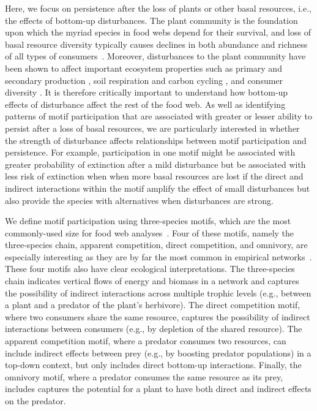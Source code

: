 \documentclass[12pt]{article}
\begin{document}
\begin{spacing}{2.0}
    
    Here, we focus on persistence after the loss of plants or other basal resources, i.e., the effects of bottom-up disturbances.
    The plant community is the foundation upon which the myriad species in food webs depend for their survival, and loss of basal resource diversity typically causes declines in both abundance and richness of all types of consumers~\citep{scherber2010bottom,Dobson2009food, Mduma1999food, Georgiadis2007}.
    Moreover, disturbances to the plant community have been shown to affect important ecosystem properties such as primary \citep{Hector1999} and secondary production \citep{borer2012plant}, soil respiration and carbon cycling \citep{chen2019plant}, and consumer diversity \citep{scherber2010bottom, Baiser2016,li2020bottom}.
    It is therefore critically important to understand how bottom-up effects of disturbance affect the rest of the food web.
    As well as identifying patterns of motif participation that are associated with greater or lesser ability to persist after a loss of basal resources, we are particularly interested in whether the strength of  disturbance affects relationships between motif participation and persistence.
    For example, participation in one motif might be associated with greater probability of extinction after a mild disturbance but be associated with less risk of extinction when when more basal resources are lost if the direct and indirect interactions within the motif amplify the effect of small disturbances but also provide the species with alternatives when disturbances are strong.

    

    We define motif participation using three-species motifs, which are the most commonly-used size for food web analyses~\citep{Milo2004,Stouffer2007,Stouffer2012,Cirtwill2015a}. 
    Four of these motifs, namely the three-species chain, apparent competition, direct competition, and omnivory, are especially interesting as they are by far the most common in empirical networks~\citep{Stouffer2007, Borrelli2015a, giling2019plant}.
    These four motifs also have clear ecological interpretations.
    The three-species chain indicates vertical flows of energy and biomass in a network and captures the possibility of indirect interactions across multiple trophic levels (e.g., between a plant and a predator of the plant's herbivore).
    The direct competition motif, where two consumers share the same resource, captures the possibility of indirect interactions between consumers (e.g., by depletion of the shared resource). 
    The apparent competition motif, where a predator consumes two resources, can include indirect effects between prey (e.g., by boosting predator populations) in a top-down context, but only includes direct bottom-up interactions.
    Finally, the omnivory motif, where a predator consumes the same resource as its prey, includes captures the potential for a plant to have both direct and indirect effects on the predator. 
    

\end{spacing}
\end{document}
